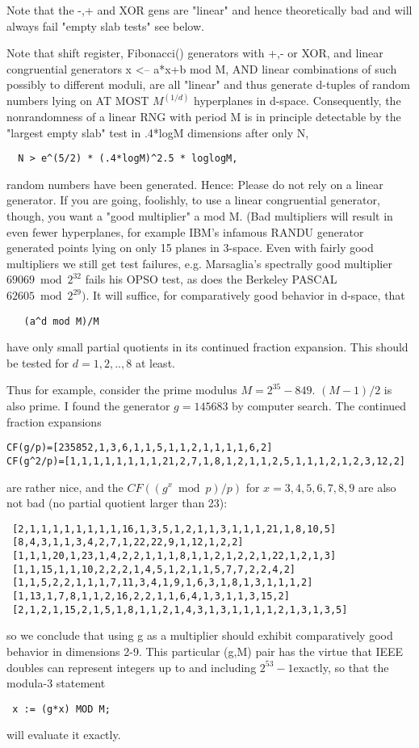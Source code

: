 Note that the -,+ and XOR gens are "linear" and hence theoretically
bad and will always fail "empty slab tests" see below.

Note that shift register, Fibonacci() generators with +,- or XOR,
and linear congruential generators x <-- a*x+b mod M, AND linear
combinations of such possibly to different moduli, are all
"linear" and thus generate d-tuples of random numbers lying on
AT MOST $M^{(1/d)}$ hyperplanes in d-space. Consequently,
the nonrandomness of a linear RNG with period M is in principle
detectable by the "largest empty slab" test in .4*logM dimensions
after only N,
\begin{verbatim}
  N > e^(5/2) * (.4*logM)^2.5 * loglogM,
\end{verbatim}
random numbers have been generated. Hence:
Please do not rely on a linear generator.
If you are going, foolishly, to use a linear congruential generator, though,
you want a "good multiplier" a mod M. (Bad multipliers
will result in even fewer hyperplanes, for example IBM's
infamous RANDU generator generated points lying on only 15 planes in 3-space.
Even with fairly good multipliers we still get test failures, e.g. Marsaglia's
spectrally good multiplier $69069 \bmod 2^{32}$ fails his OPSO test, as does
the Berkeley PASCAL $62605 \bmod 2^{29})$. It will suffice, for
comparatively good behavior in d-space, that
\begin{verbatim}
   (a^d mod M)/M
\end{verbatim}
have only small partial quotients in its continued fraction expansion.
This should be tested for $d=1,2,..,8$ at least.

Thus for example, consider the prime modulus $M=2^{35} - 849$.
$(M-1)/2$ is also prime. I found the generator $g=145683$ by computer
search. The continued fraction expansions
\begin{verbatim}
CF(g/p)=[235852,1,3,6,1,1,5,1,1,2,1,1,1,1,6,2]
CF(g^2/p)=[1,1,1,1,1,1,1,1,21,2,7,1,8,1,2,1,1,2,5,1,1,1,2,1,2,3,12,2]
\end{verbatim}
are rather nice, and the $CF( (g^x \bmod p)/p )$ for $x=3,4,5,6,7,8,9$ are
also not bad (no partial quotient larger than 23):
\begin{verbatim}
 [2,1,1,1,1,1,1,1,1,16,1,3,5,1,2,1,1,3,1,1,1,21,1,8,10,5]
 [8,4,3,1,1,3,4,2,7,1,22,22,9,1,12,1,2,2]
 [1,1,1,20,1,23,1,4,2,2,1,1,1,8,1,1,2,1,2,2,1,22,1,2,1,3]
 [1,1,15,1,1,10,2,2,2,1,4,5,1,2,1,1,5,7,7,2,2,4,2]
 [1,1,5,2,2,1,1,1,7,11,3,4,1,9,1,6,3,1,8,1,3,1,1,1,2]
 [1,13,1,7,8,1,1,2,16,2,2,1,1,6,4,1,3,1,1,3,15,2]
 [2,1,2,1,15,2,1,5,1,8,1,1,2,1,4,3,1,3,1,1,1,1,2,1,3,1,3,5]
\end{verbatim}
so we conclude that using g as a multiplier should exhibit comparatively
good behavior in dimensions 2-9. This particular (g,M) pair
has the virtue that IEEE doubles can represent integers up to and including
$2^{53} - 1 $exactly, so that the modula-3 statement
\begin{verbatim} x := (g*x) MOD M; \end{verbatim}
will evaluate it exactly.

